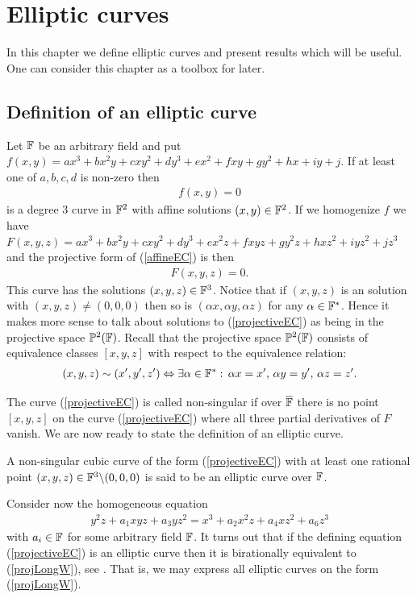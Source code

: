 \chapter{Elliptic curves}
\label{cha:EC}
In this chapter we define elliptic curves and present results which will be useful. One can consider this chapter as a toolbox for later. 
\section{Definition of an elliptic curve}
\label{sec:defEC}
Let $\mathbb{F}$ be an arbitrary field and put $f(x,y)=ax^3+bx^2y+cxy^2+dy^3+ex^2+fxy+gy^2+hx+iy+j$. If at least one of $a,b,c,d$ is non-zero then
\begin{align}\label{affineEC}
	f(x,y)=0
\end{align}
is a degree 3 curve in $\mathbb{F}^2$ with affine solutions $(x,y)\in \mathbb{F}^2$. If we homogenize $f$ we have $F(x,y,z)=ax^3+bx^2y+cxy^2+dy^3+ex^2z+fxyz+gy^2z+hxz^2+iyz^2+jz^3$ and the projective form of (\ref{affineEC}) is then
\begin{align}\label{projectiveEC}
	F(x,y,z)=0.
\end{align}
This curve has the solutions $(x,y,z)\in \mathbb{F}^3$. Notice that if $(x,y,z)$ is an solution with $(x,y,z)\neq(0,0,0)$ then so is $(\alpha x, \alpha y, \alpha z)$ for any $\alpha\in\mathbb{F}^*$. Hence it makes more sense to talk about solutions to (\ref{projectiveEC}) as being in the projective space $\mathbb{P}^2(\mathbb{F})$. Recall that the projective space $\mathbb{P}^2(\mathbb{F})$ consists of equivalence classes $[x,y,z]$ with respect to the equivalence relation:
\begin{align*}
	(x,y,z)\sim (x',y',z') \Leftrightarrow \exists \alpha\in \mathbb{F}^*:\, \alpha x=x',\, \alpha y=y',\, \alpha z=z'.
\end{align*}

The curve (\ref{projectiveEC}) is called non-singular if over $\overline{\mathbb{F}}$ there is no point $[x,y,z]$ on the curve (\ref{projectiveEC}) where all three partial derivatives of $F$ vanish. We are now ready to state the definition of an elliptic curve. 
\begin{defn}\label{def:ellipticCurve}
	A non-singular cubic curve of the form (\ref{projectiveEC}) with at least one rational point $(x,y,z)\in \mathbb{F}^3\backslash{(0,0,0)}$ is said to be an elliptic curve over $\mathbb{F}$.  
\end{defn}
Consider now the homogeneous equation 
\begin{align}\label{projLongW}
	y^2z+a_1xyz+a_3yz^2=x^3+a_2x^2z+a_4xz^2+a_6z^3
\end{align}
with $a_i\in\mathbb{F}$ for some arbitrary field $\mathbb{F}$. It turns out that if the defining equation (\ref{projectiveEC}) is an elliptic curve then it is birationally equivalent to (\ref{projLongW}), see \cite{milne2006}. That is, we may express all elliptic curves on the form (\ref{projLongW}). 


